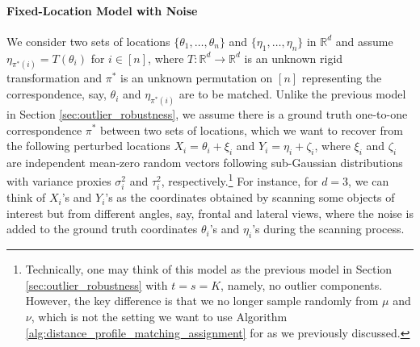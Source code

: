 \documentclass[11pt,letterpaper]{article}
\theoremstyle{definition}
\numberwithin{equation}{section}
\newcommand{\R}{\mathbb{R}}
\begin{document}
\paragraph{Fixed-Location Model with Noise}
We consider two sets of locations $\{\theta_1, \ldots, \theta_n\}$ and $\{\eta_1, \ldots, \eta_n\}$ in $\R^d$ and assume $\eta_{\pi^\ast(i)} = T(\theta_i)$ for $i \in [n]$, where $T \colon \R^d \to \R^d$ is an unknown rigid transformation and $\pi^\ast$ is an unknown permutation on $[n]$ representing the correspondence, say, $\theta_i$ and $\eta_{\pi^\ast(i)}$ are to be matched. Unlike the previous model in Section \ref{sec:outlier_robustness}, we assume there is a ground truth one-to-one correspondence $\pi^\ast$ between two sets of locations, which we want to recover from the following perturbed locations $X_i = \theta_i + \xi_i$ and $Y_i = \eta_i + \zeta_i$, where $\xi_i$ and $\zeta_i$ are independent mean-zero random vectors following sub-Gaussian distributions with variance proxies $\sigma_i^2$ and $\tau_i^2$, respectively.\footnote{Technically, one may think of this model as the previous model in Section \ref{sec:outlier_robustness} with $t = s = K$, namely, no outlier components. However, the key difference is that we no longer sample randomly from $\mu$ and $\nu$, which is not the setting we want to use Algorithm \ref{alg:distance_profile_matching_assignment} for as we previously discussed.} For instance, for $d = 3$, we can think of $X_i$'s and $Y_i$'s as the coordinates obtained by scanning some objects of interest but from different angles, say, frontal and lateral views, where the noise is added to the ground truth coordinates $\theta_i$'s and $\eta_i$'s during the scanning process. 
\end{document}
